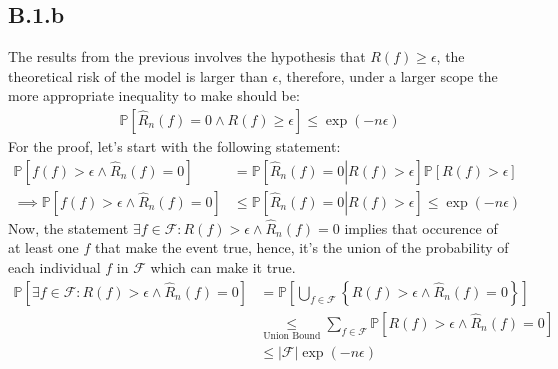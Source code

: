 \documentclass[]{article}
\begin{document}
    \subsection*{B.1.b}    
        The results from the previous involves the hypothesis that $R(f)\ge \epsilon$, the theoretical risk of the model is larger than $\epsilon$, therefore, under a larger scope the more appropriate inequality to make should be: 
        \begin{align*}\tag{B.1.b.1}\label{eqn:B.1.b.1}
            \mathbb{P}\left[
                \hat{R}_n(f) = 0\wedge R(f) \ge \epsilon
            \right] \le \exp(-n\epsilon)
        \end{align*}
        For the proof, let's start with the following statement: 
        \begin{align*}\tag{B.1.b.2}\label{eqn:B.1.b.2}
            \mathbb{P}\left[
                f(f) > \epsilon \wedge \hat{R}_n(f) = 0
            \right] &= 
            \mathbb{P}\left[\left.
                \hat{R}_n(f) = 0 \right|R(f) > \epsilon
            \right]\mathbb{P}\left[
                R(f)> \epsilon
            \right]
            \\
            \implies \mathbb{P}\left[
                f(f) > \epsilon \wedge \hat{R}_n(f) = 0
            \right]&\le \mathbb{P}\left[\left.
                \hat{R}_n(f) = 0 \right|R(f) > \epsilon
            \right] \le \exp(-n\epsilon)
        \end{align*}
        Now, the statement $\exists f\in \mathcal{F}: R(f)> \epsilon \wedge \hat{R}_n(f) = 0$ implies that occurence of at least one $f$ that make the event true, hence, it's the union of the probability of each individual $f$ in $\mathcal{F}$ which can make it true. 
        \begin{align*}\tag{B.1.b.3}\label{eqn:B.1.b.3}
            \mathbb{P}\left[
                \exists f \in \mathcal{F}: R(f) > \epsilon \wedge \hat{R}_n(f) = 0 
            \right] 
            &=
            \mathbb{P}\left[
                \bigcup_{f\in \mathcal{F}} \left\lbrace 
                R(f) > \epsilon \wedge \hat{R}_n(f) = 0
                \right\rbrace
            \right]
            \\
            &\underset{\text{Union Bound}}{\le}
            \sum_{f\in \mathcal{F}}^{}
            \mathbb{P}\left[
                R(f) > \epsilon \wedge \hat{R}_n(f) = 0
            \right]
            \\
            &\le\left|
                \mathcal{F}
            \right|\exp(-n\epsilon)
        \end{align*}
\end{document}
